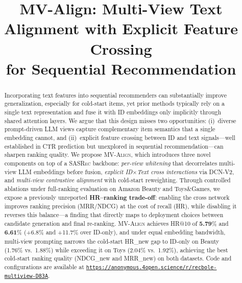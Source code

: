 \documentclass[sigconf,natbib=true,anonymous]{acmart}
\newcommand{\model}{\textsc{MV-Align}\xspace}
\newcommand{\base}{\textsc{SASRec}\xspace}
\newcommand{\llm}{\textsc{LLM}\xspace}
\begin{document}
\title{MV-Align: Multi-View Text Alignment with Explicit Feature Crossing\\
for Sequential Recommendation}


\begin{abstract}
Incorporating text features into sequential recommenders can substantially improve generalization, especially for cold-start items, yet prior methods typically rely on a single text representation and fuse it with ID embeddings only implicitly through shared attention layers.
We argue that this design misses two opportunities: (i)~diverse prompt-driven \llm views capture complementary item semantics that a single embedding cannot, and (ii)~explicit feature crossing between ID and text signals---well established in CTR prediction but unexplored in sequential recommendation---can sharpen ranking quality.
%
We propose \model, which introduces three novel components on top of a \base backbone: \emph{per-view whitening} that decorrelates multi-view \llm embeddings before fusion, \emph{explicit ID$\times$Text cross interactions} via DCN-V2, and \emph{multi-view contrastive alignment} with cold-start reweighting.
Through controlled ablations under full-ranking evaluation on Amazon Beauty and Toys\&Games, we expose a previously unreported \textbf{HR--ranking trade-off}: enabling the cross network improves ranking precision (MRR/NDCG) at the cost of recall (HR), while disabling it reverses this balance---a finding that directly maps to deployment choices between candidate generation and final re-ranking.
%
\model achieves HR@10 of \textbf{5.79}\% and \textbf{6.61}\% (+6.8\% and +11.7\% over ID-only), and under equal embedding bandwidth, multi-view prompting narrows the cold-start HR\_new gap to ID-only on Beauty (1.76\% vs.\ 1.88\%) while exceeding it on Toys (2.04\% vs.\ 1.92\%), achieving the best cold-start ranking quality (NDCG\_new and MRR\_new) on both datasets.
Code and configurations are available at \texttt{\url{https://anonymous.4open.science/r/recbole-multiview-D83A}}.
\end{abstract}


\maketitle
\end{document}
